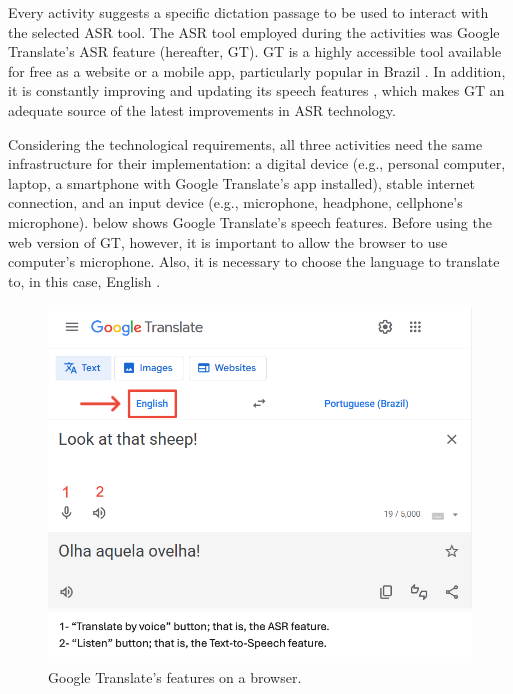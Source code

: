 \documentclass[english]{textolivre}
\begin{document}
Every activity suggests a specific dictation passage to be used to
interact with the selected ASR tool. The ASR tool employed during the
activities was Google Translate's ASR feature (hereafter, GT). GT is a
highly accessible tool available for free as a website or a mobile app,
particularly popular in Brazil \cite{google2016}. In addition, it is
constantly improving and updating its speech features
\cite{cardoso2022}, which makes GT an adequate source of the latest
improvements in ASR technology.

Considering the technological requirements, all three activities need
the same infrastructure for their implementation: a digital device
(e.g., personal computer, laptop, a smartphone with Google Translate's
app installed), stable internet connection, and an input device (e.g.,
microphone, headphone, cellphone's microphone).  below shows
Google Translate's speech features. Before using the web version of GT,
however, it is important to allow the browser to use computer's
microphone. Also, it is necessary to choose the language to translate
to, in this case, English \cite{google2024}.


\begin{figure}[htbp]
\centering
\begin{minipage}{.5\textwidth}
 \includegraphics[width=\textwidth]{fig01.png}
 \caption{Google Translate's features on a browser.}
 \label{fig01}
\end{minipage}
\end{figure}
\end{document}
